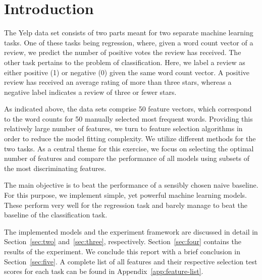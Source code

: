 \section{Introduction}
\label{sec:one}

The Yelp data set consists of two
parts meant for two separate machine learning tasks.  One of these tasks being
regression, where, given a word count vector of a review, we predict the number
of positive votes the review has received.  The other task pertains to the
problem of classification.  Here, we label a review as either positive (1) or
negative (0) given the same word count vector.  A positive review has received
an average rating of more than three stars, whereas a negative label indicates a
review of three or fewer stars.

As indicated above, the data sets comprise 50 feature vectors, which correspond
to the word counts for 50 manually selected most frequent words.  Providing this
relatively large number of features, we turn to feature selection algorithms in
order to reduce the model fitting complexity.  We utilize different methods for
the two tasks.  As a central theme for this exercise, we focus on selecting the
optimal number of features and compare the performance of all models using
subsets of the most discriminating features.

The main objective is to beat the performance of a sensibly chosen naive
baseline.  For this purpose, we implement simple, yet powerful machine learning
models.  These perform very well for the regression task and barely manage to
beat the baseline of the classification task.

The implemented models and the experiment framework are discussed in detail in
Section~\ref{sec:two} and~\ref{sec:three}, respectively.  Section~\ref{sec:four}
contains the results of the experiment.  We conclude this report with a brief
conclusion in Section~\ref{sec:five}.  A complete list of all features and their
respective selection test scores for each task can be found in
Appendix~\ref{app:feature-list}.

